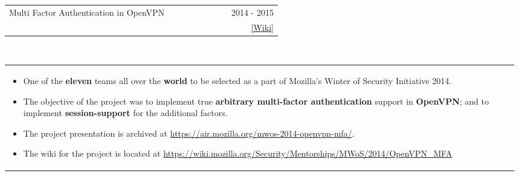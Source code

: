 \documentclass[a4paper]{article} %
\newcommand{\verticalspacing}{-0.25cm}
\newcommand{\bulletspace}{0.7cm}
\newcommand{\projectheadspacing}{6.9cm}
\newcommand{\cproject}[5]{%
    \begin{tabular}{p{0.60\linewidth}r}
        \textcolor{NavyBlue}{\small #2} & \multicolumn{1}{m{ \projectheadspacing{} }}{\raggedleft \small {\textsc{#1}}}\\
        \small {#3} & \small {#4}
    \end{tabular}\\
    \begin{tabular}{p{0.98\linewidth}}
    \vspace{-0.3cm}
        \small{#5}
    \end{tabular}
    \vspace{\verticalspacing{}}
}
\begin{document}
\cproject
    {2014 - 2015}
    {Multi Factor Authentication in OpenVPN}
    {\textsc{\raggedright Mozilla Winter of Security}, Guillaume Destuynder, Professor Dheeraj Sanghi}
    {\href{https://wiki.mozilla.org/Security/Mentorships/MWoS/2014/OpenVPN\_MFA} {[Wiki]} }
    {%
        \begin{itemize}[leftmargin=\bulletspace{}]
          \item One of the \textbf{eleven} teams all over the \textbf{world} to be selected as a part of Mozilla's Winter of Security Initiative 2014.
          \item The objective of the project was to implement true \textbf{arbitrary multi-factor authentication} support in
              \textbf{OpenVPN}; and to implement \textbf{session-support} for the additional factors.
          \item The project presentation is archived at
              \href{https://air.mozilla.org/mwos-2014-openvpn-mfa/}{https://air.mozilla.org/mwos-2014-openvpn-mfa/}.
          \item The wiki for the project is located at \href{https://wiki.mozilla.org/Security/Mentorships/MWoS/2014/OpenVPN\_MFA} {https://wiki.mozilla.org/Security/Mentorships/MWoS/2014/OpenVPN\_MFA}
      \end{itemize}
    }


\end{document}
